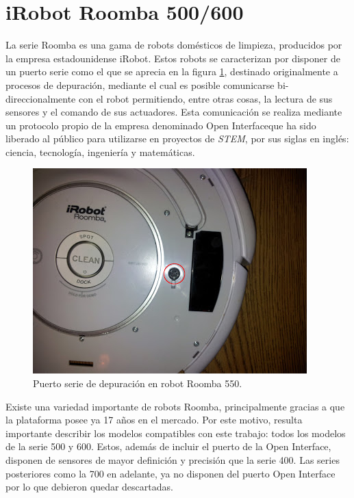 
\section{iRobot Roomba 500/600}

La serie Roomba es una gama de robots domésticos de limpieza, producidos por la empresa estadounidense iRobot. Estos robots se caracterizan por disponer de un puerto serie como el que se aprecia en la figura \ref{fig:roombaSerialPort}, destinado originalmente a procesos de depuración, mediante el cual es posible comunicarse bi-direccionalmente con el robot permitiendo, entre otras cosas, la lectura de sus sensores y el comando de sus actuadores. Esta comunicación se realiza mediante un protocolo propio de la empresa denominado Open Interface\protect\footnotemark que ha sido liberado al público para utilizarse en proyectos de \textit{STEM}, por sus siglas en inglés: ciencia, tecnología, ingeniería y matemáticas.



\begin{figure}[ht]
    \centering
    \includegraphics[scale=.5]{./Figures/roomba_serial_port.jpg}
    \caption{Puerto serie de depuración en robot Roomba 550.}
    \label{fig:roombaSerialPort}
\end{figure}

Existe una variedad importante de robots Roomba, principalmente gracias a que la plataforma posee ya 17 años en el mercado. Por este motivo, resulta importante describir los modelos compatibles con este trabajo: todos los modelos de la serie 500 y 600. Estos, además de incluir el puerto de la Open Interface, disponen de sensores de mayor definición y precisión que la serie 400. Las series posteriores como la 700 en adelante, ya no disponen del puerto Open Interface por lo que debieron quedar descartadas.


